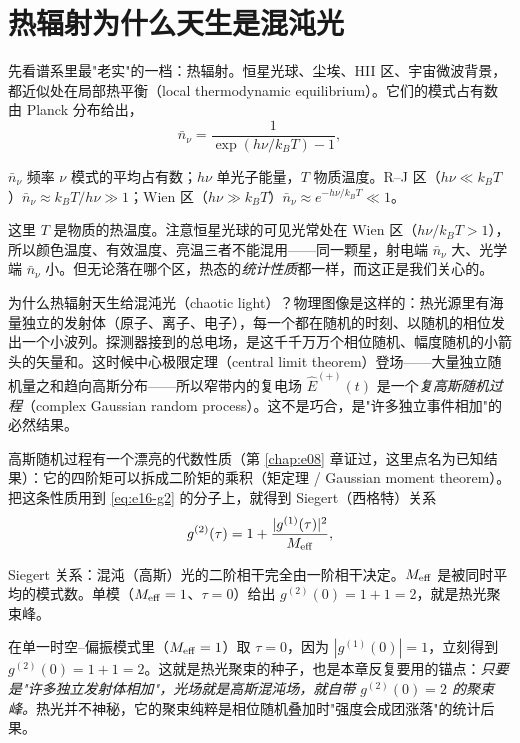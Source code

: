 \section{热辐射为什么天生是混沌光}
\label{sec:e16-thermal}

先看谱系里最"老实"的一档：热辐射。恒星光球、尘埃、HII 区、宇宙微波背景，都近似处在局部热平衡（local thermodynamic equilibrium）。它们的模式占有数由 Planck 分布给出，
\begin{equation}
  \bar n_\nu=\frac{1}{\exp(h\nu/k_BT)-1},
  \label{eq:e16-planck-occupation}
\end{equation}
\begin{formulaexplain}
\(\bar n_\nu\) 频率 \(\nu\) 模式的平均占有数；\(h\nu\) 单光子能量，\(T\) 物质温度。R--J 区（\(h\nu\ll k_BT\)）\(\bar n_\nu\approx k_BT/h\nu\gg1\)；Wien 区（\(h\nu\gg k_BT\)）\(\bar n_\nu\approx e^{-h\nu/k_BT}\ll1\)。
\end{formulaexplain}
这里 \(T\) 是物质的热温度。注意恒星光球的可见光常处在 Wien 区（\(h\nu/k_BT>1\)），所以颜色温度、有效温度、亮温三者不能混用——同一颗星，射电端 \(\bar n_\nu\) 大、光学端 \(\bar n_\nu\) 小。但无论落在哪个区，热态的\emph{统计性质}都一样，而这正是我们关心的。

为什么热辐射天生给混沌光（chaotic light）？物理图像是这样的：热光源里有海量独立的发射体（原子、离子、电子），每一个都在随机的时刻、以随机的相位发出一个小波列。探测器接到的总电场，是这千千万万个相位随机、幅度随机的小箭头的矢量和。这时候中心极限定理（central limit theorem）登场——大量独立随机量之和趋向高斯分布——所以窄带内的复电场 \(\hat E^{(+)}(t)\) 是一个\emph{复高斯随机过程}（complex Gaussian random process）。这不是巧合，是"许多独立事件相加"的必然结果。

高斯随机过程有一个漂亮的代数性质（第 \ref{chap:e08} 章证过，这里点名为已知结果）：它的四阶矩可以拆成二阶矩的乘积（矩定理 / Gaussian moment theorem）。把这条性质用到 \eqref{eq:e16-g2} 的分子上，就得到 Siegert（西格特）关系
\begin{equation}
  g^{(2)}(\tau)=1+\frac{|g^{(1)}(\tau)|^2}{M_{\rm eff}},
  \label{eq:e16-siegert}
\end{equation}
\begin{formulaexplain}
Siegert 关系：混沌（高斯）光的二阶相干完全由一阶相干决定。\(M_{\rm eff}\) 是被同时平均的模式数。单模（\(M_{\rm eff}=1\)、\(\tau=0\)）给出 \(g^{(2)}(0)=1+1=2\)，就是热光聚束峰。
\end{formulaexplain}
在单一时空--偏振模式里（\(M_{\rm eff}=1\)）取 \(\tau=0\)，因为 \(|g^{(1)}(0)|=1\)，立刻得到 \(g^{(2)}(0)=1+1=2\)。这就是热光聚束的种子，也是本章反复要用的锚点：\emph{只要是"许多独立发射体相加"，光场就是高斯混沌场，就自带 \(g^{(2)}(0)=2\) 的聚束峰。}热光并不神秘，它的聚束纯粹是相位随机叠加时"强度会成团涨落"的统计后果。

